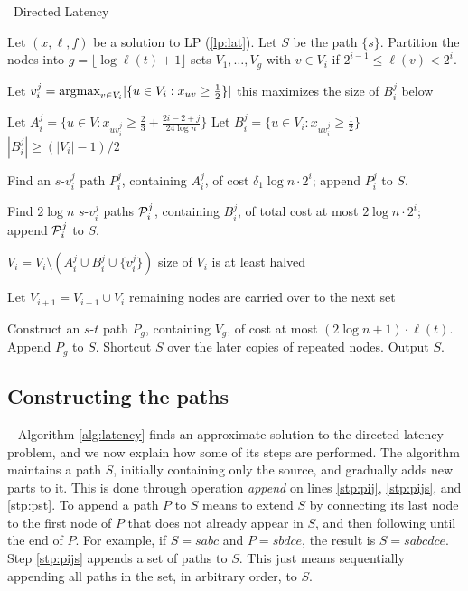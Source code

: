 \documentclass[11pt]{article}
\newcommand{\argmax}{{\rm argmax}}
\begin{document}
\begin{algorithm*}[ht]
  \caption{~Directed Latency} \label{alg:latency} 
\begin{algorithmic}[1] 
\State Let $({x},{\ell},{f})$ be a solution to LP (\ref{lp:lat}). Let $S$ be the path $\{s\}$.
\State Partition the nodes into $g = \lfloor \log \ell(t)+1 \rfloor$
sets $V_1,\ldots,V_g$ with $v\in V_i$ if $2^{i-1}\leq\ell(v)< 2^i$.
\label{stp:forloop}

\State Let $v_i^j = \argmax_{v\in V_i} |\{ u\in V_i : x_{uv} \geq \frac{1}{2} \}|$ \label{step:vij}
\Comment this maximizes the size of $B_i^j$ below

\State Let $A_i^j = \{u\in V: x_{uv_i^j} \geq \frac{2}{3}+\frac{2i-2+j}{24\log n}\}$
\State Let $B_i^j = \{u\in V_i: x_{uv_i^j} \geq \frac{1}{2} \}$
\Comment $|B_i^j| \geq (|V_i|-1)/2$

\State Find an $s$-$v^j_i$ path $P^j_i$, containing $A_i^j$, of cost $\delta_1 \log n \cdot 2^i$; append $P^j_i$ to $S$. \label{stp:pij}

\State Find $2 \log n$ $s$-$v^j_i$ paths ${\cal P}^j_i$, containing $B_i^j$, of total cost at most 
$2\log n\cdot 2^i$; append ${\cal P}^j_i$ to $S$. \label{stp:pijs}

\State $V_i = V_i \setminus (A_i^j \cup B_i^j \cup \{v_i^j\})$ \label{stp:decv}
\Comment size of $V_i$ is at least halved

\EndIf
\EndFor
\State Let $V_{i+1} = V_{i+1} \cup V_i$ \label{stp:move-nodes}
\Comment remaining nodes are carried over to the next set

\EndFor
\State Construct an $s$-$t$ path $P_g$, containing $V_g$, of cost at most $(2\log n+1)\cdot \ell(t)$.  Append $P_g$ to $S$. \label{stp:pst}
\State Shortcut $S$ over the later copies of repeated nodes. Output $S$.

\end{algorithmic}
\end{algorithm*}

\subsection{Constructing the paths}~
Algorithm \ref{alg:latency} finds an approximate solution to the directed latency problem, and we now explain how some of its steps are performed. The algorithm maintains a path $S$, initially containing only the source, and gradually adds new parts to it. This is done through operation \emph{append} on lines \ref{stp:pij}, \ref{stp:pijs}, and \ref{stp:pst}. To append a path $P$ to $S$ means to extend $S$ by connecting its last node to the first node of $P$ that does not already appear in $S$, and then following until the end of $P$. For example, if $S=sabc$ and $P=sbdce$, the result is $S=sabcdce$. Step \ref{stp:pijs} appends a set of paths to $S$. This just means sequentially appending all paths in the set, in arbitrary order, to $S$.
\end{document}
